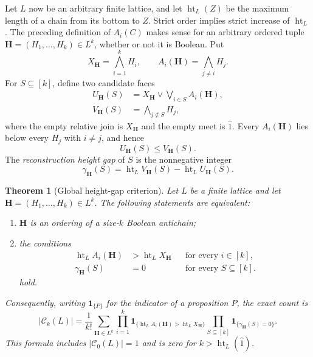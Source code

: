 \documentclass[11pt]{article}
\newtheorem{theorem}{Theorem}[section]
\theoremstyle{definition}
\theoremstyle{remark}
\newcommand{\lht}{\operatorname{ht}}
\newcommand{\cC}{\mathcal C}
\begin{document}
Let $L$ now be an arbitrary finite lattice, and let $\lht_L(Z)$ be the maximum
length of a chain from its bottom to $Z$.  Strict order implies strict increase
of $\lht_L$.  The preceding definition of $A_i(C)$ makes sense for an arbitrary
ordered tuple $\mathbf H=(H_1,\ldots,H_k)\in L^k$, whether or not it is
Boolean.
Put
\[
 X_{\mathbf H}=\bigwedge_{i=1}^k H_i,
 \qquad
 A_i(\mathbf H)=\bigwedge_{j\ne i}H_j.
\]
For $S\subseteq[k]$, define two candidate faces
\begin{align*}
 U_{\mathbf H}(S)
   &=X_{\mathbf H}\vee\bigvee_{i\in S}A_i(\mathbf H),\\
 V_{\mathbf H}(S)
   &=\bigwedge_{j\notin S}H_j,
\end{align*}
where the empty relative join is $X_{\mathbf H}$ and the empty meet is
$\hat1$.
Every $A_i(\mathbf H)$ lies below every $H_j$ with $i\ne j$, and hence
\[
 U_{\mathbf H}(S)\le V_{\mathbf H}(S).
\]
The \emph{reconstruction height gap} of $S$ is the nonnegative integer
\begin{equation}\label{eq:reconstruction-gap}
 \gamma_{\mathbf H}(S)
 =\lht_L V_{\mathbf H}(S)-\lht_L U_{\mathbf H}(S).
\end{equation}

\begin{theorem}[Global height-gap criterion]\label{thm:global-gap}
Let $L$ be a finite lattice and let
$\mathbf H=(H_1,\ldots,H_k)\in L^k$.  The following statements are
equivalent:
\begin{enumerate}
\item $\mathbf H$ is an ordering of a size-$k$ Boolean antichain;
\item the conditions
\begin{align}
 \lht_L A_i(\mathbf H)&>\lht_L X_{\mathbf H}
     &&\text{for every }i\in[k],\label{eq:atomic-rise}\\
 \gamma_{\mathbf H}(S)&=0
     &&\text{for every }S\subseteq[k].\label{eq:all-gaps-zero}
\end{align}
hold.
\end{enumerate}
Consequently, writing $\mathbf 1_{\{P\}}$ for the indicator of a proposition
$P$, the exact count is
\begin{equation}\label{eq:global-enumerator}
 \boxed{
 |\cC_k(L)|=\frac1{k!}
 \sum_{\mathbf H\in L^k}
 \prod_{i=1}^k
   \mathbf 1_{\{\lht_L A_i(\mathbf H)>\lht_L X_{\mathbf H}\}}
 \prod_{S\subseteq[k]}
   \mathbf 1_{\{\gamma_{\mathbf H}(S)=0\}}.}
\end{equation}
This formula includes $|\cC_0(L)|=1$ and is zero for $k>\lht_L(\hat1)$.
\end{theorem}
\end{document}
